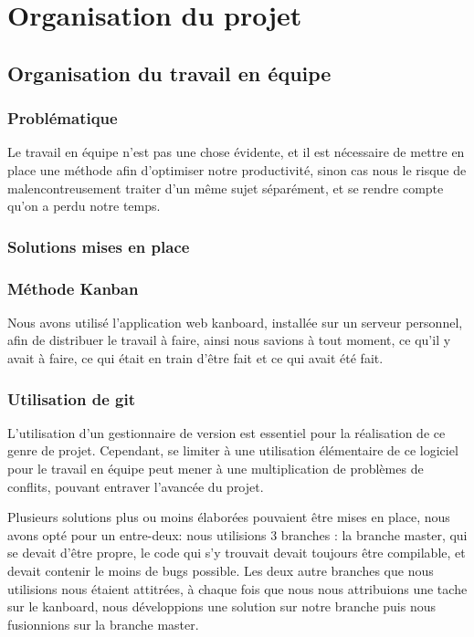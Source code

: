 

\section{Organisation du projet}


\subsection{Organisation du travail en équipe}

\subsubsection*{Problématique}

    Le travail en équipe n'est pas une chose évidente, et il est nécessaire de mettre en
place une méthode afin d'optimiser notre productivité, sinon cas nous le risque de 
malencontreusement traiter d'un même sujet séparément, et se rendre compte qu'on a perdu notre
temps.

\subsubsection*{Solutions mises en place}

\subsubsection*{Méthode Kanban}

    Nous avons utilisé l'application web kanboard, installée sur un serveur personnel, afin de
distribuer le travail à faire, ainsi nous savions à tout moment, ce qu'il y avait à faire,
ce qui était en train d'être fait et ce qui avait été fait. 


\subsubsection*{Utilisation de git}

    L'utilisation d'un gestionnaire de version est essentiel pour la 
réalisation de ce genre de projet. Cependant, se limiter à une utilisation élémentaire
de ce logiciel pour le travail en équipe peut mener à une multiplication de problèmes de 
conflits, pouvant entraver l'avancée du projet. 

    Plusieurs solutions plus ou moins élaborées pouvaient être mises en place, nous avons opté 
pour un entre-deux: nous utilisions 3 branches : la branche master, qui se devait d'être 
propre, le code qui s'y trouvait devait toujours être
compilable, et devait contenir le moins de bugs possible. Les deux autre branches que nous
utilisions nous étaient attitrées, à chaque fois que nous nous attribuions une tache sur le
kanboard, nous développions une solution sur notre branche puis nous fusionnions sur la branche
master.

